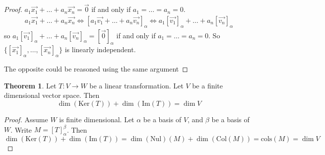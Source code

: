\documentclass{article}
\theoremstyle{definition}
\newtheorem{theorem}{Theorem}[section]
\theoremstyle{remark}
\begin{document}
\begin{proof}
$a_1\vec{x_1}+\dots+a_n\vec{x_n}=\vec{0}$ if and only if $a_1=\dots=a_n=0$.
    \[
    \begin{aligned}
        a_1\vec{x_1}+\dots+a_n\vec{x_n}\iff[a_1\vec{v_1}+\dots+a_n\vec{v_n}]_{\alpha}\iff a_1[\vec{v_1}]_{\alpha}+\dots+a_n[\vec{v_n}]_{\alpha}
    \end{aligned}
    \]
    so $a_1[\vec{v_1}]_{\alpha}+\dots+a_n[\vec{v_n}]_{\alpha}=[\vec{0}]_{\alpha}$ if and only if $a_1=\dots=a_n=0$.
    So $\{[\vec{x_1}]_{\alpha},\dots, [\vec{x_n}]_{\alpha}\}$ is linearly independent.
        
    The opposite could be reasoned using the same argument
\end{proof}

\begin{theorem}
    Let $T:V\rightarrow W$ be a linear transformation. 
    Let $V$ be a finite dimensional vector space. Then
    \[
    \dim (\text{Ker} (T))+\dim(\text{Im}(T))=\dim V
    \]
\end{theorem}

\begin{proof}
    Assume $W$ is finite dimensional.
    Let $\alpha$ be a basis of $V$, and $\beta$ be a basis of $W$. 
    Write $M=[T]_{\alpha}^{\beta}$. Then 
    \[
    \dim (\text{Ker} (T))+\dim(\text{Im}(T))=\dim (\text{Nul} )(M)+\dim(\text{Col}(M))= \text{cols}(M) =\dim V
    \]
\end{proof}
\end{document}
